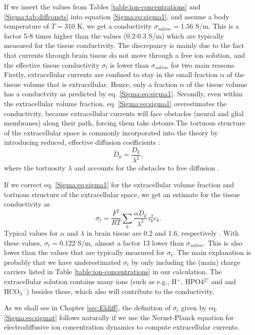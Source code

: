 If we insert the values from Tables \ref{table:ion-concentrations} and \ref{Sigma:tab:diffconsts} into equation \ref{Sigma:eq:sigma1}, and assume a body temperature of $T = 310$ K, we get a conductivity $\sigma_{saline} = 1.56$ S/m. This is a factor 5-8 times higher than the values (0.2-0.3 S/m) which are typically measured for the tissue conductivity. The discrepancy is mainly due to the fact that currents through brain tissue do not move through a free ion solution, and the effective tissue conductivity $\sigma_t$ is lower than $\sigma_{saline}$ for two main reasons. Firstly, extracellular currents are confined to stay in the small fraction $\alpha$ of the tissue volume that is extracellular. Hence, only a fraction $\alpha$ of the tissue volume has a conductvity as predicted by eq. \ref{Sigma:eq:sigma1}. Secondly, even within the extracellular volume fraction, eq. \ref{Sigma:eq:sigma1} overestimates the conductivity, because extracellular currents will face obstacles (neural and glial membranes) along their path, forcing them take detours.The tortuous structure of the extracellular space is commonly incorporated into the theory by introducing reduced, effective diffusion coefficients \citep{Nicholson1981}: 
\begin{equation}
\tilde{D}_k = \frac{D_k}{\lambda^2}, 
\label{Sigma:eq:diffconst}
\end{equation}
where the tortuosity $\lambda$ and accounts for the obstacles to free diffusion \citep{Nicholson1981}. 

If we correct eq. \ref{Sigma:eq:sigma1} for the extracellular volume fraction and tortuous structure of the extracellular space, we get an estimate for the tissue conductivity as
\begin{equation}
\sigma_{t} = \frac{F^2}{RT}\sum_{k} \frac{\alpha D_k}{\lambda^2} z_{k}^2 c_{k}.
\label{Sigma:eq:sigmat}
\end{equation}
Typical values for $\alpha$ and $\lambda$ in brain tissue are 0.2 and 1.6, respectively \citep{Nicholson1981, Nicholson1998}. With these values, $\sigma_t = 0.122$ S/m, almost a factor 13 lower than $\sigma_{saline}$. This is also lower than the values that are typically measured for $\sigma_t$. The main explanation is probably that we have underestimated $\sigma_t$ by only including the (main) charge carriers listed in Table \ref{table:ion-concentrations} in our calculation. The extracellular solution contains many ions (such as e.g., H$^+$, HPO4$^{2?}$ and and HCO$_3$$^-$) besides these, which also will contribute to the conductivity. 


As we shall see in Chapter \ref{sec:Eldiff}, the definition of $\sigma_t$ given by eq. \ref{Sigma:eq:sigmat} follows naturally if we use the Nernst-Planck equation for electrodiffusive ion concentration dynamics to compute extracellular currents. 
